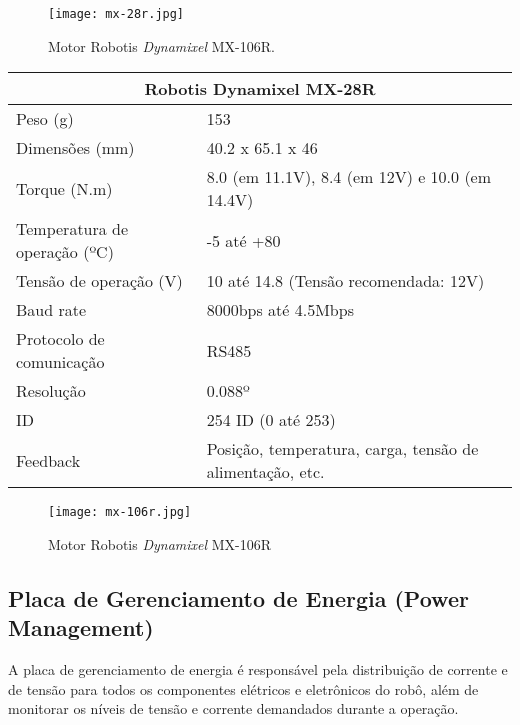 \begin{figure}[h!]												
	\centering												
	\texttt{[image: mx-28r.jpg]}				
	\caption{Motor Robotis\textit{ Dynamixel} MX-106R.}		
	\label{img:ihelic}												
\end{figure}
\hspace{2cm}
\begin{table}[]
	\begin{tabular}{ll}
	
		\multicolumn{2}{c}{Robotis Dynamixel MX-28R}                                            \\ \hline
		Peso (g)                     & 153                                                      \\ \hline
		Dimensões (mm)               & 40.2 x 65.1 x 46                                         \\ \hline
		Torque (N.m)                 & 8.0 (em 11.1V), 8.4 (em 12V) e 10.0 (em 14.4V)           \\ \hline
		Temperatura de operação (ºC) & -5 até +80                                               \\ \hline
		Tensão de operação (V)       & 10 até 14.8 (Tensão recomendada: 12V)                    \\ \hline
		Baud rate                    & 8000bps até 4.5Mbps                                      \\ \hline
		Protocolo de comunicação     & RS485                                                    \\ \hline
		Resolução                    & 0.088º                                                   \\ \hline
		ID                           & 254 ID (0 até 253)                                       \\ \hline
		Feedback                     & Posição, temperatura, carga, tensão de alimentação, etc. \\ \hline
	\end{tabular}
\end{table}
\hspace{1cm}

\begin{figure}[h!]												
	\centering												
	\texttt{[image: mx-106r.jpg]}				
	\caption{Motor Robotis\textit{ Dynamixel} MX-106R}		
	\label{img:ihelic}	
	
\end{figure}
\subsection{Placa de Gerenciamento de Energia (Power Management)}
A placa de gerenciamento de energia é responsável pela distribuição de corrente e de tensão para todos os componentes elétricos e eletrônicos do robô, além de monitorar os níveis de tensão e corrente demandados durante a operação. 


